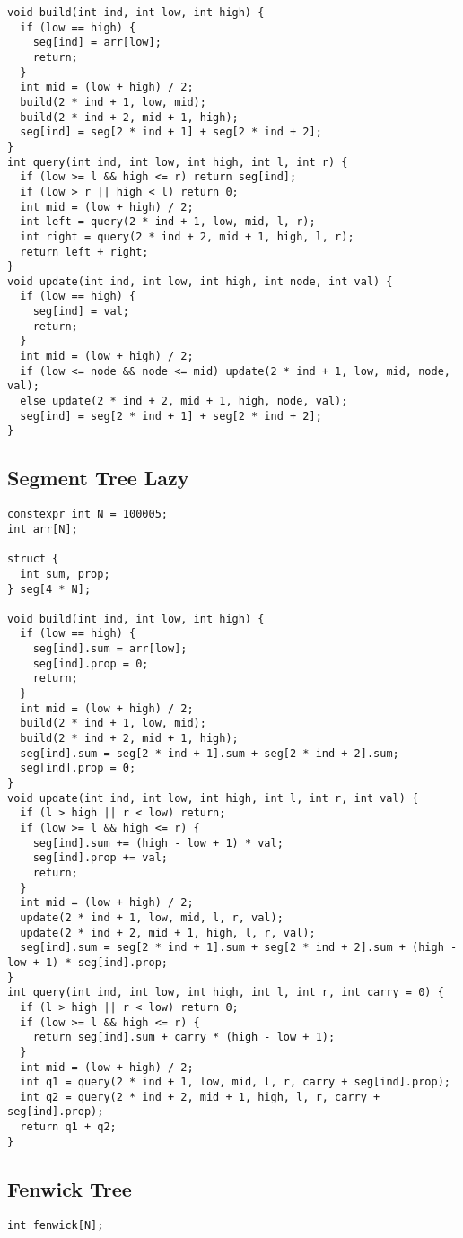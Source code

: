 \documentclass[10pt, a4paper]{article}
\begin{document}
\begin{multicols}{2}
\begin{lstlisting}
void build(int ind, int low, int high) {
  if (low == high) {
    seg[ind] = arr[low];
    return;
  }
  int mid = (low + high) / 2;
  build(2 * ind + 1, low, mid);
  build(2 * ind + 2, mid + 1, high);
  seg[ind] = seg[2 * ind + 1] + seg[2 * ind + 2];
}
int query(int ind, int low, int high, int l, int r) {
  if (low >= l && high <= r) return seg[ind];
  if (low > r || high < l) return 0;
  int mid = (low + high) / 2;
  int left = query(2 * ind + 1, low, mid, l, r);
  int right = query(2 * ind + 2, mid + 1, high, l, r);
  return left + right;
}
void update(int ind, int low, int high, int node, int val) {
  if (low == high) {
    seg[ind] = val;
    return;
  }
  int mid = (low + high) / 2;
  if (low <= node && node <= mid) update(2 * ind + 1, low, mid, node, val);
  else update(2 * ind + 2, mid + 1, high, node, val);
  seg[ind] = seg[2 * ind + 1] + seg[2 * ind + 2];
}
\end{lstlisting}
\subsection{Segment Tree Lazy}
\begin{lstlisting}
constexpr int N = 100005;
int arr[N];

struct {
  int sum, prop;
} seg[4 * N];

void build(int ind, int low, int high) {
  if (low == high) {
    seg[ind].sum = arr[low];
    seg[ind].prop = 0;
    return;
  }
  int mid = (low + high) / 2;
  build(2 * ind + 1, low, mid);
  build(2 * ind + 2, mid + 1, high);
  seg[ind].sum = seg[2 * ind + 1].sum + seg[2 * ind + 2].sum;
  seg[ind].prop = 0;
}
void update(int ind, int low, int high, int l, int r, int val) {
  if (l > high || r < low) return;
  if (low >= l && high <= r) {
    seg[ind].sum += (high - low + 1) * val;
    seg[ind].prop += val;
    return;
  }
  int mid = (low + high) / 2;
  update(2 * ind + 1, low, mid, l, r, val);
  update(2 * ind + 2, mid + 1, high, l, r, val);
  seg[ind].sum = seg[2 * ind + 1].sum + seg[2 * ind + 2].sum + (high - low + 1) * seg[ind].prop;
}
int query(int ind, int low, int high, int l, int r, int carry = 0) {
  if (l > high || r < low) return 0;
  if (low >= l && high <= r) {
    return seg[ind].sum + carry * (high - low + 1);
  }
  int mid = (low + high) / 2;
  int q1 = query(2 * ind + 1, low, mid, l, r, carry + seg[ind].prop);
  int q2 = query(2 * ind + 2, mid + 1, high, l, r, carry + seg[ind].prop);
  return q1 + q2;
}
\end{lstlisting}
\subsection{Fenwick Tree}
\begin{lstlisting}
int fenwick[N];


\end{lstlisting}
\end{multicols}
\end{document}
